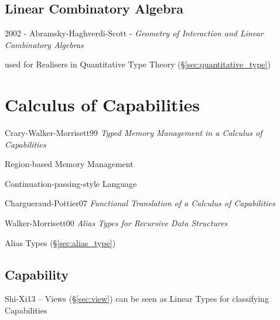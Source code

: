 \subsection{Linear Combinatory Algebra}\label{sec:linear_combinatory_algebra}

2002 - Abramsky-Haghverdi-Scott - \emph{Geometry of Interaction and Linear
  Combinatory Algebras}

used for Realisers in Quantitative Type Theory
(\S\ref{sec:quantitative_type})



\section{Calculus of Capabilities}\label{sec:capabilities_calculus}

Crary-Walker-Morrisett99 \emph{Typed Memory Management in a Calculus
  of Capabilities}

Region-based Memory Management

Continuation-passing-style Language

Chargueraud-Pottier07 \emph{Functional Translation of a Calculus of
  Capabilities}

Walker-Morrisett00 \emph{Alias Types for Recursive Data Structures}

Alias Types (\S\ref{sec:alias_type})



\subsection{Capability}\label{sec:capability}

Shi-Xi13 -- Views (\S\ref{sec:view}) can be seen as Linear Types for
classifying Capabilities
